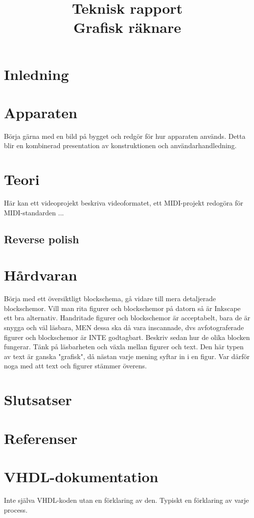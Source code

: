 \documentclass[]{article}
\title{Teknisk rapport\\Grafisk räknare}
\author{}
\begin{document}
\maketitle

\begin{abstract}
\end{abstract}
\section{Inledning}

\section{Apparaten}
Börja gärna med en bild på bygget och redgör för hur apparaten används. Detta blir en kombinerad presentation av konstruktionen och användarhandledning. 
\section{Teori}
Här kan ett videoprojekt beskriva videoformatet, ett MIDI-projekt redogöra för MIDI-standarden ...
\subsection{Reverse polish}
\section{Hårdvaran}
Börja med ett översiktligt blockschema, gå vidare till mera detaljerade blockschemor. Vill man rita figurer och blockschemor på datorn så är Inkscape ett bra alternativ. Handritade figurer och blockschemor är acceptabelt, bara de är snygga och väl läsbara, MEN dessa ska då vara inscannade, dvs avfotograferade figurer och blockschemor är INTE godtagbart.
Beskriv sedan hur de olika blocken fungerar. Tänk på läsbarheten och växla mellan figurer och text. Den här typen av text är ganska "grafisk", då nästan varje mening syftar in i en figur. Var därför noga med att text och figurer stämmer överens.
\section{Slutsatser}
\section{Referenser}
\section{VHDL-dokumentation}
Inte själva VHDL-koden utan en förklaring av den. Typiskt en förklaring av varje process.
\end{document}
